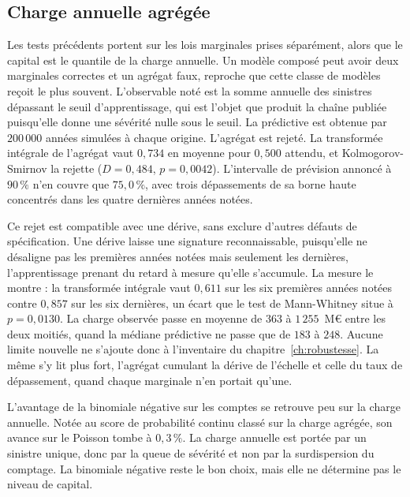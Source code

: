 \subsection{Charge annuelle agrégée}

Les tests précédents portent sur les lois marginales prises séparément, alors que le capital est le quantile de
la charge annuelle. Un modèle composé peut avoir deux marginales correctes et un agrégat faux, reproche que cette
classe de modèles reçoit le plus souvent. L'observable noté est la somme annuelle des sinistres dépassant le
seuil d'apprentissage, qui est l'objet que produit la chaîne publiée puisqu'elle donne une sévérité nulle sous le
seuil. La prédictive est obtenue par $200\,000$ années simulées à chaque origine. L'agrégat est rejeté. La
transformée intégrale de l'agrégat vaut $0{,}734$ en moyenne pour $0{,}500$ attendu, et Kolmogorov-Smirnov la
rejette ($D = 0{,}484$, $p = 0{,}0042$). L'intervalle de prévision annoncé à $90\,\%$ n'en couvre que $75{,}0\,\%$,
avec trois dépassements de sa borne haute concentrés dans les quatre dernières années notées.

Ce rejet est compatible avec une dérive, sans exclure d'autres défauts de spécification. Une dérive laisse une
signature reconnaissable, puisqu'elle ne désaligne pas les premières années notées mais seulement les dernières,
l'apprentissage prenant du retard à mesure qu'elle s'accumule. La mesure le montre : la transformée intégrale vaut
$0{,}611$ sur les six premières années notées contre $0{,}857$ sur les six dernières, un écart que le test de
Mann-Whitney situe à $p = 0{,}0130$. La charge observée passe en moyenne de $363$ à $1\,255$~M\euro{} entre les deux
moitiés, quand la médiane prédictive ne passe que de $183$ à $248$. Aucune limite nouvelle ne s'ajoute donc à
l'inventaire du chapitre~\ref{ch:robustesse}. La même s'y lit plus fort, l'agrégat cumulant la dérive de l'échelle
et celle du taux de dépassement, quand chaque marginale n'en portait qu'une.

L'avantage de la binomiale négative sur les comptes se retrouve peu sur la charge annuelle.
Notée au score de probabilité continu classé
sur la charge agrégée, son avance sur le Poisson tombe à $0{,}3\,\%$. La charge annuelle est portée par un sinistre
unique, donc par la queue de sévérité et non par la surdispersion du comptage. La binomiale négative reste le bon
choix, mais elle ne détermine pas le niveau de capital.

